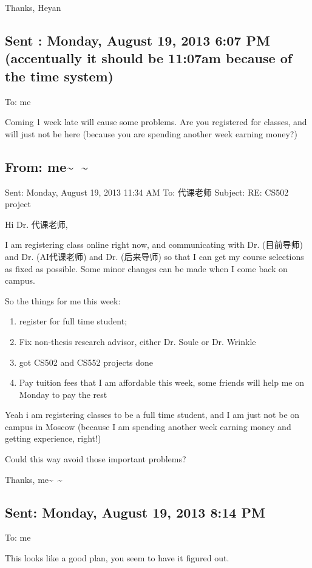 \documentclass[12pt]{book}
\begin{document}
Thanks,
Heyan

\subsection{Sent : Monday, August 19, 2013 6:07 PM  (accentually it should be 11:07am because of the time system)}
\label{sec-7-2-2}
To: me

Coming 1 week late will cause some problems.  Are you registered for classes, and will just not be here (because you are spending another week earning money?)

\subsection{From: me\textasciitilde{}~\textasciitilde{}}
\label{sec-7-2-3}
Sent: Monday, August 19, 2013 11:34 AM
To: 代课老师
Subject: RE: CS502 project

Hi Dr. 代课老师, 

I am registering class online right now, and communicating with Dr. (目前导师) and Dr. (AI代课老师) and Dr. (后来导师) so that I can get my course selections as fixed as possible. Some minor changes can be made when I come back on campus. 

So the things for me this week: 
\begin{enumerate}
\item register for full time student;
\item Fix non-thesis research advisor, either Dr. Soule or Dr. Wrinkle
\item got CS502 and CS552 projects done
\item Pay tuition fees that I am affordable this week, some friends will help me on Monday to pay the rest
\end{enumerate}

Yeah i am registering classes to be a full time student, and I am just not be on campus in Moscow (because I am spending another week earning money and getting experience, right!)

Could this way avoid those important problems?

Thanks,
me\textasciitilde{}~\textasciitilde{}

\subsection{Sent: Monday, August 19, 2013 8:14 PM}
\label{sec-7-2-4}
To: me

This looks like a good plan, you seem to have it figured out.
\end{document}
